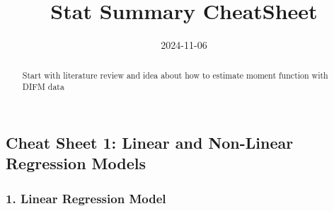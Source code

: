 \documentclass[
]{article}
\title{Stat Summary CheatSheet}
\date{2024-11-06}
\begin{document}
\maketitle
\begin{abstract}
Start with literature review and idea about how to estimate moment
function with DIFM data
\end{abstract}


\subsection{\texorpdfstring{\textbf{Cheat Sheet 1: Linear and Non-Linear
Regression
Models}}{Cheat Sheet 1: Linear and Non-Linear Regression Models}}\label{cheat-sheet-1-linear-and-non-linear-regression-models}

\subsubsection{\texorpdfstring{\textbf{1. Linear Regression
Model}}{1. Linear Regression Model}}\label{linear-regression-model}
\end{document}

